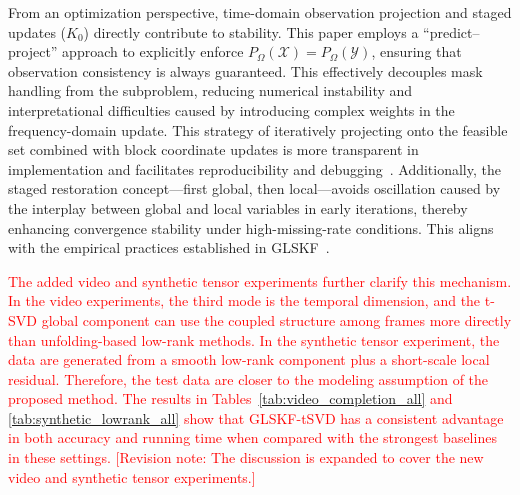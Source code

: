 \documentclass[a4paper,12pt]{article}
\numberwithin{equation}{section}
\numberwithin{algorithm}{section}
\newcommand{\rev}[1]{\textcolor{red}{#1}}
\newcommand{\revnote}[1]{\textcolor{red}{[Revision note: #1]}}
\theoremstyle{remark}
\theoremstyle{definition}
\begin{document}
From an optimization perspective, time-domain observation projection and staged updates ($K_0$) directly contribute to stability. This paper employs a “predict–project” approach to explicitly enforce $P_{\Omega}(\mathcal{X}) = P_{\Omega}(\mathcal{Y})$, ensuring that observation consistency is always guaranteed. This effectively decouples mask handling from the subproblem, reducing numerical instability and interpretational difficulties caused by introducing complex weights in the frequency-domain update. This strategy of iteratively projecting onto the feasible set combined with block coordinate updates is more transparent in implementation and facilitates reproducibility and debugging~\cite{lei2024glskf}. Additionally, the staged restoration concept—first global, then local—avoids oscillation caused by the interplay between global and local variables in early iterations, thereby enhancing convergence stability under high-missing-rate conditions. This aligns with the empirical practices established in GLSKF~\cite{lei2024glskf}.


\rev{The added video and synthetic tensor experiments further clarify this mechanism. In the video experiments, the third mode is the temporal dimension, and the t-SVD global component can use the coupled structure among frames more directly than unfolding-based low-rank methods. In the synthetic tensor experiment, the data are generated from a smooth low-rank component plus a short-scale local residual. Therefore, the test data are closer to the modeling assumption of the proposed method. The results in Tables~\ref{tab:video_completion_all} and \ref{tab:synthetic_lowrank_all} show that GLSKF-tSVD has a consistent advantage in both accuracy and running time when compared with the strongest baselines in these settings.} \revnote{The discussion is expanded to cover the new video and synthetic tensor experiments.}
\end{document}

